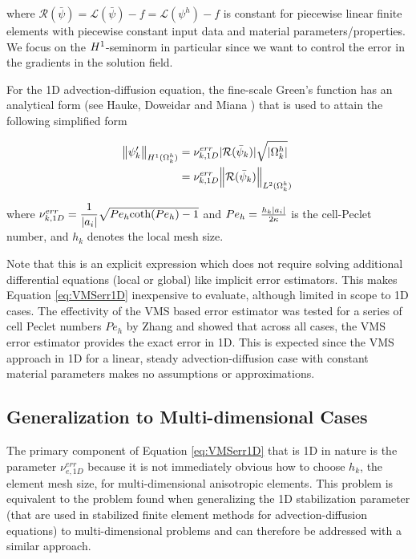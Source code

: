 \noindent where $\mathcal{R}(\bar{\psi})=\mathcal{L}(\bar{\psi})-f=\mathcal{L}(\psi^h)-f$ is constant for piecewise linear finite elements with piecewise constant input data and material parameters/properties.
We focus on the $H^{1}$-seminorm in particular since we want to control the error in the gradients in the solution field.

For the 1D advection-diffusion equation, the fine-scale Green's function has an analytical form (see Hauke, Doweidar and Miana \cite{hauke2006proper}) that is used to attain the following simplified form

\begin{align}
      \norm{\psi_k'}_{H^1(\Omega^h_k)} &= \nu^{err}_{k,1D} |\mathcal{R}(\bar{\psi}_k)| \sqrt{|\Omega^h_k|} \\
            &= \nu^{err}_{k,1D} \norm{\mathcal{R}(\bar{\psi}_k)}_{L^2(\Omega^h_k)}
      \label{eq:VMSerr1D}
\end{align}

\noindent where $\nu^{err}_{k,1D} = \dfrac{1}{|a_i|} \sqrt{Pe_h \text{coth}({Pe_h})-1}$ and $Pe_h = \frac{h_k |a_i|}{2\kappa}$ is the cell-Peclet number, and $h_k$ denotes the local mesh size.

Note that this is an explicit expression which does not require solving additional differential equations (local or global) like implicit error estimators.
This makes Equation \ref{eq:VMSerr1D} inexpensive to evaluate, although limited in scope to 1D cases. The effectivity of the VMS based error estimator was tested for a series of cell Peclet numbers $Pe_h$ by Zhang \cite{zhang19} and showed that across all cases, the VMS error estimator provides the exact error in 1D. 
This is expected since the VMS approach in 1D for a linear, steady advection-diffusion case with constant material parameters makes no assumptions or approximations.

\subsection{Generalization to Multi-dimensional Cases}

The primary component of Equation \ref{eq:VMSerr1D} that is 1D in nature is the parameter $\nu^{err}_{e,1D}$ because it is not immediately obvious how to choose $h_k$, the element mesh size, for multi-dimensional anisotropic elements.
This problem is equivalent to the problem found when generalizing the 1D stabilization parameter (that are used in stabilized finite element methods for advection-diffusion equations) to multi-dimensional problems \cite{hughes1986newiii} and can therefore be addressed with a similar approach.

